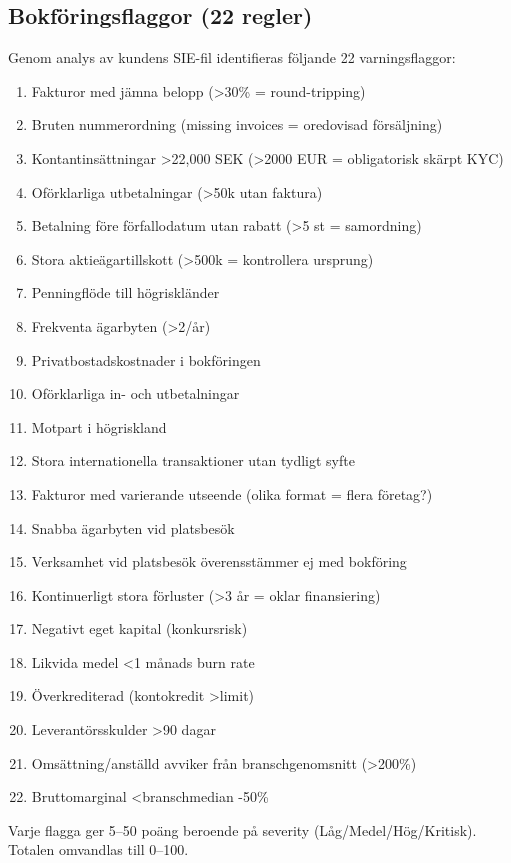 \documentclass{article}
\begin{document}
\subsection*{Bokföringsflaggor (22 regler)}

Genom analys av kundens SIE-fil identifieras följande 22 varningsflaggor:

\begin{enumerate}
\item Fakturor med jämna belopp (>30\% = round-tripping)
\item Bruten nummerordning (missing invoices = oredovisad försäljning)
\item Kontantinsättningar >22,000 SEK (>2000 EUR = obligatorisk skärpt KYC)
\item Oförklarliga utbetalningar (>50k utan faktura)
\item Betalning före förfallodatum utan rabatt (>5 st = samordning)
\item Stora aktieägartillskott (>500k = kontrollera ursprung)
\item Penningflöde till högriskländer
\item Frekventa ägarbyten (>2/år)
\item Privatbostadskostnader i bokföringen
\item Oförklarliga in- och utbetalningar
\item Motpart i högriskland
\item Stora internationella transaktioner utan tydligt syfte
\item Fakturor med varierande utseende (olika format = flera företag?)
\item Snabba ägarbyten vid platsbesök
\item Verksamhet vid platsbesök överensstämmer ej med bokföring
\item Kontinuerligt stora förluster (>3 år = oklar finansiering)
\item Negativt eget kapital (konkursrisk)
\item Likvida medel <1 månads burn rate
\item Överkrediterad (kontokredit >limit)
\item Leverantörsskulder >90 dagar
\item Omsättning/anställd avviker från branschgenomsnitt (>200\%)
\item Bruttomarginal <branschmedian -50\%
\end{enumerate}

Varje flagga ger 5--50 poäng beroende på severity (Låg/Medel/Hög/Kritisk). Totalen omvandlas till 0--100.
\end{document}
